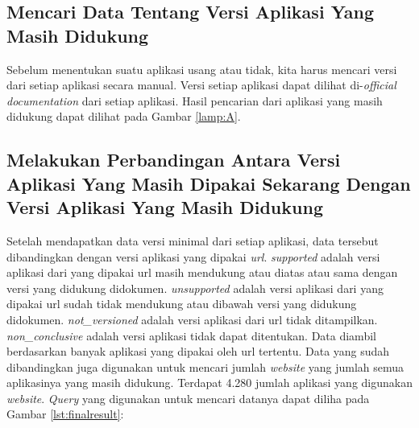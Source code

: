 \subsection{Mencari Data Tentang Versi Aplikasi Yang Masih Didukung}
Sebelum menentukan suatu aplikasi usang atau tidak, kita harus mencari versi dari setiap aplikasi secara manual. Versi setiap aplikasi dapat dilihat di-\textit{official documentation} dari setiap aplikasi. Hasil pencarian dari aplikasi yang masih didukung dapat dilihat pada Gambar \ref{lamp:A}. 

\subsection{Melakukan Perbandingan Antara Versi Aplikasi Yang Masih Dipakai Sekarang Dengan Versi Aplikasi Yang Masih Didukung}
Setelah mendapatkan data versi minimal dari setiap aplikasi, data tersebut dibandingkan dengan versi aplikasi yang dipakai \textit{url}. \textit{supported} adalah versi aplikasi dari yang dipakai url masih mendukung atau diatas atau sama dengan versi yang didukung didokumen. \textit{unsupported} adalah versi aplikasi dari yang dipakai url sudah tidak mendukung atau dibawah versi yang didukung didokumen. \textit{not\_versioned} adalah versi aplikasi dari url tidak ditampilkan. \textit{non\_conclusive} adalah versi aplikasi tidak dapat ditentukan. Data diambil berdasarkan banyak aplikasi yang dipakai oleh url tertentu. Data yang sudah dibandingkan juga digunakan untuk mencari jumlah \textit{website} yang jumlah semua aplikasinya yang masih didukung. Terdapat 4.280 jumlah aplikasi yang digunakan \textit{website}. \textit{Query} yang digunakan untuk mencari datanya dapat diliha pada Gambar \ref{lst:finalresult}:

